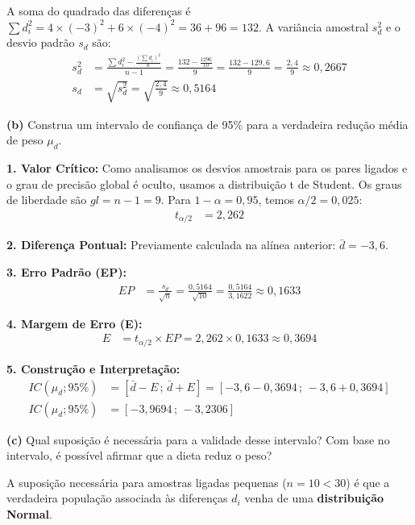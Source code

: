 \documentclass[12pt, a4paper]{article}
\begin{document}
\noindent A soma do quadrado das diferenças é $\sum d_i^2 = 4 \times (-3)^2 + 6 \times (-4)^2 = 36 + 96 = 132$. A variância amostral $s_d^2$ e o desvio padrão $s_d$ são:
\begin{align*}
s_d^2 &= \frac{\sum d_i^2 - \frac{(\sum d_i)^2}{n}}{n-1} = \frac{132 - \frac{1296}{10}}{9} = \frac{132 - 129,6}{9} = \frac{2,4}{9} \approx 0,2667 \\
s_d &= \sqrt{s_d^2} = \sqrt{\frac{2,4}{9}} \approx \boxed{0,5164}
\end{align*}

\medskip\noindent\textbf{(b)} Construa um intervalo de confiança de 95\% para a verdadeira redução média de peso $\mu_d$.

\noindent \textbf{1. Valor Crítico:} Como analisamos os desvios amostrais para os pares ligados e o grau de precisão global é oculto, usamos a distribuição t de Student. Os graus de liberdade são $gl = n - 1 = 9$. Para $1-\alpha = 0,95$, temos $\alpha/2 = 0,025$:
\begin{align*}
t_{\alpha/2} &= \boxed{2,262}
\end{align*}

\noindent \textbf{2. Diferença Pontual:} Previamente calculada na alínea anterior: $\bar{d} = -3,6$.

\noindent \textbf{3. Erro Padrão (EP):}
\begin{align*}
EP &= \frac{s_d}{\sqrt{n}} = \frac{0,5164}{\sqrt{10}} = \frac{0,5164}{3,1622} \approx \boxed{0,1633}
\end{align*}

\noindent \textbf{4. Margem de Erro (E):}
\begin{align*}
E &= t_{\alpha/2} \times EP = 2,262 \times 0,1633 \approx \boxed{0,3694}
\end{align*}

\noindent \textbf{5. Construção e Interpretação:}
\begin{align*}
IC(\mu_d; 95\%) &= [\bar{d} - E \,;\, \bar{d} + E] = [-3,6 - 0,3694 \,;\, -3,6 + 0,3694] \\
IC(\mu_d; 95\%) &= \boxed{[-3,9694 \,;\, -3,2306]}
\end{align*}

\medskip\noindent\textbf{(c)} Qual suposição é necessária para a validade desse intervalo? Com base no intervalo, é possível afirmar que a dieta reduz o peso?

\noindent A suposição necessária para amostras ligadas pequenas ($n = 10 < 30$) é que a verdadeira população associada às diferenças $d_i$ venha de uma \textbf{distribuição Normal}.
\end{document}
